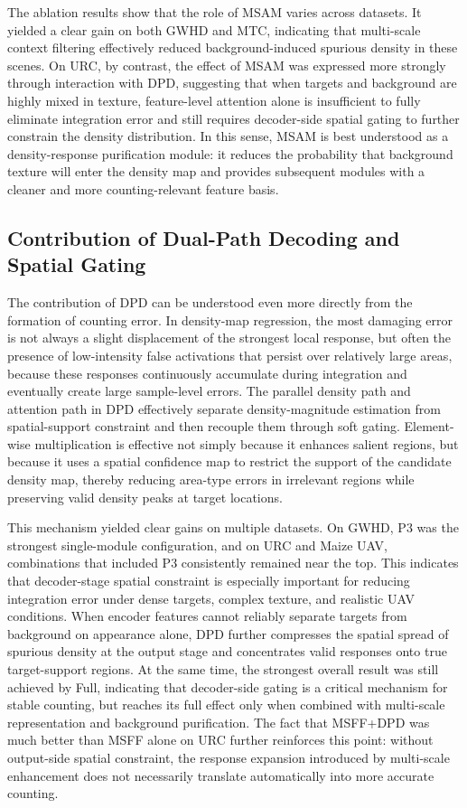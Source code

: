 \documentclass[a4paper,fleqn]{cas-sc}
\begin{document}
	The ablation results show that the role of MSAM varies across datasets. It yielded a clear gain on both GWHD and MTC, indicating that multi-scale context filtering effectively reduced background-induced spurious density in these scenes. On URC, by contrast, the effect of MSAM was expressed more strongly through interaction with DPD, suggesting that when targets and background are highly mixed in texture, feature-level attention alone is insufficient to fully eliminate integration error and still requires decoder-side spatial gating to further constrain the density distribution. In this sense, MSAM is best understood as a density-response purification module: it reduces the probability that background texture will enter the density map and provides subsequent modules with a cleaner and more counting-relevant feature basis.
	
	\subsection{Contribution of Dual-Path Decoding and Spatial Gating}
	
	The contribution of DPD can be understood even more directly from the formation of counting error. In density-map regression, the most damaging error is not always a slight displacement of the strongest local response, but often the presence of low-intensity false activations that persist over relatively large areas, because these responses continuously accumulate during integration and eventually create large sample-level errors. The parallel density path and attention path in DPD effectively separate density-magnitude estimation from spatial-support constraint and then recouple them through soft gating. Element-wise multiplication is effective not simply because it enhances salient regions, but because it uses a spatial confidence map to restrict the support of the candidate density map, thereby reducing area-type errors in irrelevant regions while preserving valid density peaks at target locations.
	
	This mechanism yielded clear gains on multiple datasets. On GWHD, P3 was the strongest single-module configuration, and on URC and Maize UAV, combinations that included P3 consistently remained near the top. This indicates that decoder-stage spatial constraint is especially important for reducing integration error under dense targets, complex texture, and realistic UAV conditions. When encoder features cannot reliably separate targets from background on appearance alone, DPD further compresses the spatial spread of spurious density at the output stage and concentrates valid responses onto true target-support regions. At the same time, the strongest overall result was still achieved by Full, indicating that decoder-side gating is a critical mechanism for stable counting, but reaches its full effect only when combined with multi-scale representation and background purification. The fact that MSFF+DPD was much better than MSFF alone on URC further reinforces this point: without output-side spatial constraint, the response expansion introduced by multi-scale enhancement does not necessarily translate automatically into more accurate counting.
	
\end{document}
